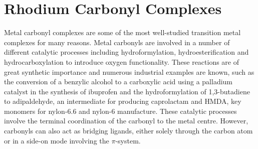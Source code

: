 %

\section{Rhodium Carbonyl Complexes}

Metal carbonyl complexes are some of the most well-studied transition metal complexes for many reasons.  Metal carbonyls are involved in a number of different catalytic processes including hydroformylation, hydroesterification and hydrocarboxylation to introduce oxygen functionality.\cite{Leeuwenbook2000, Guiu2006, Bertoux1999}  These reactions are of great synthetic importance and numerous industrial examples are known, such as the conversion of a benzylic alcohol to a carboxylic acid using a palladium catalyst in the synthesis of ibuprofen\cite{Kjonaas2011} and the hydroformylation of 1,3-butadiene to adipaldehyde, an intermediate for producing caprolactam and \gls{HMDA}, key monomers for nylon-6.6 and nylon-6 manufacture.\cite{Franke2012}  These catalytic processes involve the terminal coordination of the carbonyl to the metal centre.  However, carbonyls can also act as bridging ligands, either solely through the carbon atom or in a side-on  mode involving the $\pi$-system.  


